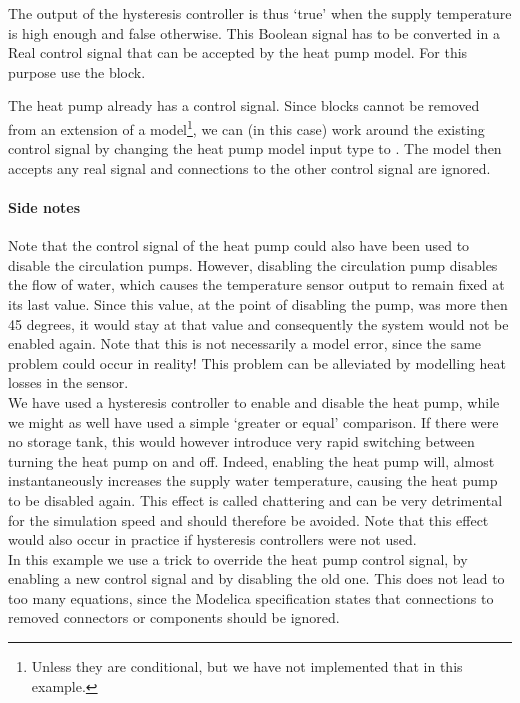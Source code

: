 \documentclass[10pt,a4paper]{article}
\begin{document}
The output of the hysteresis controller is thus `true' when the supply temperature is 
high enough and false otherwise.
This Boolean signal has to be converted in a Real control signal that can be
accepted by the heat pump model.
For this purpose use the  block.

The heat pump already has a control signal. 
Since blocks cannot be removed from an extension of a model\footnote{Unless 
they are conditional, but we have not implemented that in this example.},
we can (in this case) work around the existing control signal
by changing the heat pump model input type to .
The model then accepts any real signal and connections to the other control 
signal are ignored. 


\paragraph{Side notes}
Note that the control signal of the heat pump could also have been used to disable
the circulation pumps.
However, disabling the circulation pump disables the flow of water,
which causes the temperature sensor output to remain fixed at
its last value.
Since this value, at the point of disabling the pump, was more then 45 degrees,
it would stay at that value and consequently the system would not be enabled again.
Note that this is not necessarily a model error, since the same problem could
occur in reality! This problem can be alleviated by modelling
heat losses in the sensor.\\


We have used a hysteresis controller to enable and disable the heat pump,
while we might as well have used a simple `greater or equal' comparison.
If there were no storage tank,
this would however introduce very rapid switching between turning the heat pump on
and off. Indeed, enabling the heat pump will, almost instantaneously increases the 
supply water temperature, causing the heat pump to be disabled again.
This effect is called chattering and can be very detrimental for the simulation speed 
and should therefore be avoided.
Note that this effect would also occur in practice if hysteresis controllers were not used.\\

In this example we use a trick to override the heat pump control signal, by enabling a new
control signal and by disabling the old one. This does not lead
to too many equations, since the Modelica specification states that 
connections to removed connectors or components should be ignored.
\end{document}
